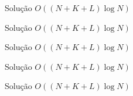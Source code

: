 \begin{frame}[fragile]{Solução $O((N + K + L)\log N)$}
\end{frame}

\begin{frame}[fragile]{Solução $O((N + K + L)\log N)$}
\end{frame}

\begin{frame}[fragile]{Solução $O((N + K + L)\log N)$}
\end{frame}

\begin{frame}[fragile]{Solução $O((N + K + L)\log N)$}
\end{frame}

\begin{frame}[fragile]{Solução $O((N + K + L)\log N)$}
\end{frame}
